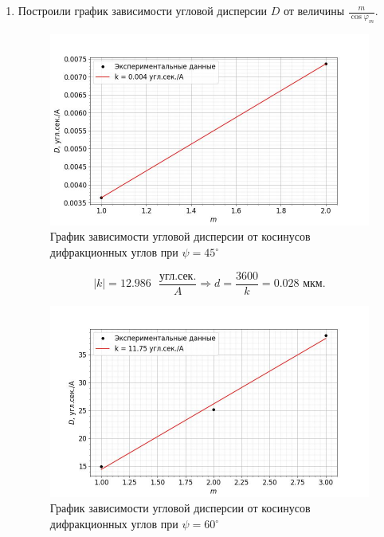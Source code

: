 \documentclass[a4paper,12pt]{article} %
\begin{document}
\begin{enumerate}
    \item Построили график зависимости угловой дисперсии $D$ от величины $\frac{m}{\cos{\varphi_m}}$.

    \begin{figure}[h]
        \begin{center}
            \includegraphics[width=16cm]{image2.jpg}
        \end{center}
        \caption{График зависимости угловой дисперсии от косинусов дифракционных углов при $\psi=45^{\circ}$}
        \label{img4}
    \end{figure}

    \[ |k| = 12.986\text{ }\frac{\text{угл.сек.}}{A} \Longrightarrow d = \frac{3600}{k} = 0.028\text{ мкм}. \]

\newpage

    \begin{figure}[h]
        \begin{center}
            \includegraphics[width=16cm]{image3.jpg}
        \end{center}
        \caption{График зависимости угловой дисперсии от косинусов дифракционных углов при $\psi=60^{\circ}$}
        \label{img5}
    \end{figure}


\end{enumerate}
\end{document}
